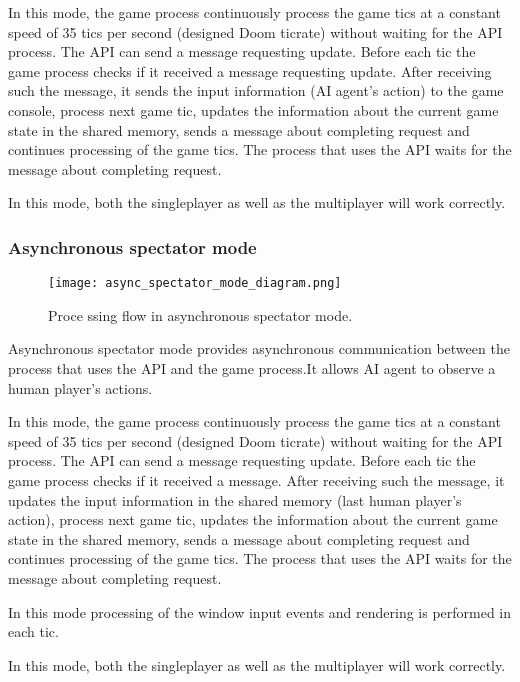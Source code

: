 	    In this mode, the game process continuously process the game tics at a constant speed of 35 tics per second (designed Doom ticrate) without waiting for the API process. The API can send a message requesting update. Before each tic the game process checks if it received a message requesting update. After receiving such the message, it sends the input information (AI agent's action) to the game console, process next game tic, updates the information about the current game state in the shared memory, sends a message about completing request and continues processing of the game tics. The process that uses the API waits for the message about completing request.
	    
	    In this mode, both the singleplayer as well as the multiplayer will work correctly.

    \subsubsection{Asynchronous spectator mode}\label{sec:architecture_async_spectator_mode}

	    \begin{figure}
			    \centering
			    \texttt{[image: async\_spectator\_mode\_diagram.png]}
			    \caption{Proce      ssing flow in asynchronous spectator mode.}\label{fig:async_spectator_mode_diagram}
	    \end{figure}
	    
	    Asynchronous spectator mode provides asynchronous communication between the process that uses the API and the game process.It allows AI agent to observe a human player's actions. 
	    
	    In this mode, the game process continuously process the game tics at a constant speed of 35 tics per second (designed Doom ticrate) without waiting for the API process. The API can send a message requesting update. Before each tic the game process checks if it received a message. After receiving such the message, it updates the input information in the shared memory (last human player's action), process next game tic, updates the information about the current game state in the shared memory, sends a message about completing request and continues processing of the game tics. The process that uses the API waits for the message about completing request.

        In this mode processing of the window input events and rendering is performed in each tic.
        
        In this mode, both the singleplayer as well as the multiplayer will work correctly.

